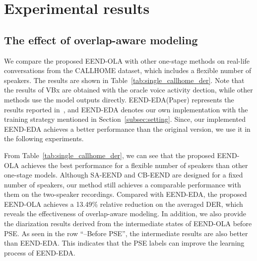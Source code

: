 \documentclass{article}
\begin{document}
\section{Experimental results}
\subsection{The effect of overlap-aware modeling}
We compare the proposed EEND-OLA with other one-stage methods on real-life conversations from the CALLHOME dataset, which includes a flexible number of speakers. The results are shown in Table~\ref{tab:single_callhome_der}. Note that the results of VBx are obtained with the oracle voice activity dection, while other methods use the model outputs directly. EEND-EDA(Paper) represents the results reported in~\cite{EEND_EDA}, and EEND-EDA denotes our own implementation with the training strategy mentioned in Section~\ref{subsec:setting}. Since, our implemented EEND-EDA achieves a better performance than the original version, we use it in the following experiments.

From Table~\ref{tab:single_callhome_der}, we can see that the proposed EEND-OLA achieves the best performance for a flexible number of speakers than other one-stage models.
Although SA-EEND and CB-EEND are designed for a fixed number of speakers, our method still achieves a comparable performance with them on the two-speaker recordings.
Compared with EEND-EDA, the proposed EEND-OLA achieves a 13.49\% relative reduction on the averaged DER, which reveals the effectiveness of overlap-aware modeling.
In addition, we also provide the diarization results derived from the intermediate states of EEND-OLA before PSE. As seen in the row ``--Before PSE'', the intermediate results are also better than EEND-EDA. This indicates that the PSE labels can improve the learning process of EEND-EDA.
\end{document}
